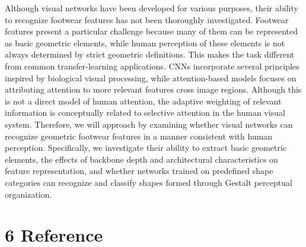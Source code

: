 \documentclass[
  letterpaper,
  DIV=11,
  numbers=noendperiod]{scrartcl}
\begin{document}
Although visual networks have been developed for various purposes, their
ability to recognize footwear features has not been thoroughly
investigated. Footwear features present a particular challenge because
many of them can be represented as basic geometric elements, while human
perception of these elements is not always determined by strict
geometric definitions. This makes the task different from common
transfer-learning applications. CNNs incorporate several principles
inspired by biological visual processing, while attention-based models
focuses on attributing attention to more relevant features cross image
regions. Although this is not a direct model of human attention, the
adaptive weighting of relevant information is conceptually related to
selective attention in the human visual system. Therefore, we will
approach by examining whether visual networks can recognize geometric
footwear features in a manner consistent with human perception.
Specifically, we investigate their ability to extract basic geometric
elements, the effects of backbone depth and architectural
characteristics on feature representation, and whether networks trained
on predefined shape categories can recognize and classify shapes formed
through Gestalt perceptual organization.

\newpage

\section{6 Reference}\label{reference}
\end{document}
